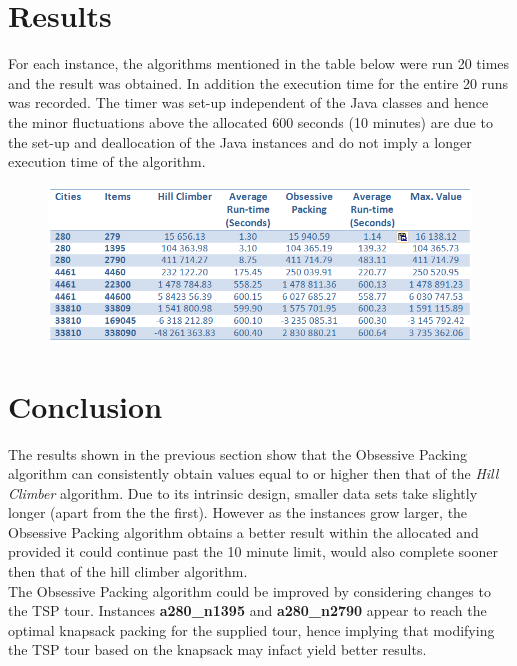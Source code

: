 \documentclass[a4paper,12pt]{article}
\begin{document}
\section{Results}
For each instance, the algorithms mentioned in the table below were run 20 times and the result was obtained. In addition the execution time for the entire 20 runs was recorded. The timer was set-up independent of the Java classes and hence the minor fluctuations above the allocated 600 seconds (10 minutes) are due to the set-up and deallocation of the Java instances and do not imply a longer execution time of the algorithm.
\begin{figure}[h]
\centering
\includegraphics[width=\linewidth]{ResultsTable.png}
\end{figure}

\section{Conclusion}
The results shown in the previous section show that the Obsessive Packing algorithm can consistently obtain values equal to or higher then that of the \textit{Hill Climber} algorithm. Due to its intrinsic design, smaller data sets take slightly longer (apart from the the first). However as the instances grow larger,  the Obsessive Packing algorithm obtains a better result within the allocated and provided it could continue past the 10 minute limit, would also complete sooner then that of the hill climber algorithm.\\

The Obsessive Packing algorithm could be improved by considering changes to the TSP tour. Instances {\bf a280\_n1395} and {\bf a280\_n2790} appear to reach the optimal knapsack packing for the supplied tour, hence implying that modifying the TSP tour based on the knapsack may infact yield better results.
\end{document}
